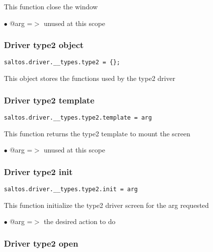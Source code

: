 \documentclass[a4paper]{article}
\begin{document}
This function close the window

\begin{compactitem}
\item[\color{myblue}$\bullet$] @arg =$>$ unused at this scope
\end{compactitem}

\hypertarget{toc744}{}
\subsubsection{Driver type2 object}

\begin{lstlisting}
saltos.driver.__types.type2 = {};
\end{lstlisting}

This object stores the functions used by the type2 driver

\hypertarget{toc745}{}
\subsubsection{Driver type2 template}

\begin{lstlisting}
saltos.driver.__types.type2.template = arg
\end{lstlisting}

This function returns the type2 template to mount the screen

\begin{compactitem}
\item[\color{myblue}$\bullet$] @arg =$>$ unused at this scope
\end{compactitem}

\hypertarget{toc746}{}
\subsubsection{Driver type2 init}

\begin{lstlisting}
saltos.driver.__types.type2.init = arg
\end{lstlisting}

This function initialize the type2 driver screen for the arg requested

\begin{compactitem}
\item[\color{myblue}$\bullet$] @arg =$>$ the desired action to do
\end{compactitem}

\hypertarget{toc747}{}
\subsubsection{Driver type2 open}
\end{document}
